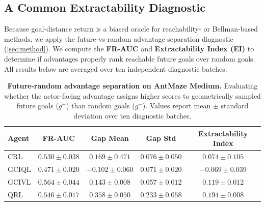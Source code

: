 
\subsection{A Common Extractability Diagnostic}
\label{sec:experiments:extractability}

Because goal-distance return is a biased oracle for reachability- or Bellman-based methods, we apply the future-vs-random advantage separation diagnostic (\cref{sec:method}). We compute the \textbf{FR-AUC} and \textbf{Extractability Index (EI)} to determine if advantages properly rank reachable future goals over random goals. All results below are averaged over ten independent diagnostic batches.

\begin{table}[h]
  \centering
  \small
  \setlength{\tabcolsep}{4.5pt}
  \begin{tabular}{lcccc}
    \toprule
    \textbf{Agent}
    & \textbf{FR-AUC}
    & \textbf{Gap Mean}
    & \textbf{Gap Std}
    & \textbf{Extractability Index} \\
    \midrule
    CRL   & $0.530 \pm 0.038$ & $ 0.169 \pm 0.471$ & $0.076 \pm 0.050$ & $ 0.074 \pm 0.105$ \\
    GCIQL & $0.471 \pm 0.020$ & $-0.102 \pm 0.060$ & $0.071 \pm 0.020$ & $-0.069 \pm 0.039$ \\
    GCIVL & $0.564 \pm 0.044$ & $ 0.143 \pm 0.008$ & $0.057 \pm 0.012$ & $ 0.119 \pm 0.012$ \\
    QRL   & $0.546 \pm 0.017$ & $ 0.358 \pm 0.050$ & $0.233 \pm 0.058$ & $ 0.194 \pm 0.008$ \\
    \bottomrule
  \end{tabular}
  \vspace{0.5em}
  \caption{
    \textbf{Future-random advantage separation on AntMaze Medium.}
    Evaluating whether the actor-facing advantage assigns higher scores to geometrically sampled future goals ($g^+$) than random goals ($g^-$). Values report mean \(\pm\) standard deviation over ten diagnostic batches.
  }
  \label{tab:afr}
\end{table}

